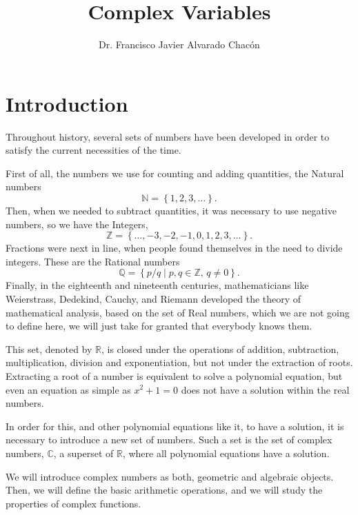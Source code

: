 \documentclass{article}
\newcommand{\reals}{\mathbb{R}}
\newcommand{\complex}{\mathbb{C}}
\begin{document}
\title{Complex Variables}
\author{Dr. Francisco Javier Alvarado Chacón}
\maketitle
\section{Introduction}

Throughout history, several sets of numbers have been developed in order to satisfy the current necessities of the time.

First of all, the numbers we use for counting and adding quantities, the Natural numbers
\[
\mathbb{N}=\left\lbrace 1,2,3,\dots\right\rbrace.
\]
Then, when we needed to subtract quantities, it was necessary to use negative numbers, so we have the Integers,
\[
\mathbb{Z}=\left\lbrace\dots,-3,-2,-1,0,1,2,3,\dots\right\rbrace.
\]
Fractions were next in line, when people found themselves in the need to divide integers. These are the Rational numbers
\[
\mathbb{Q}=\left\lbrace p/q \mid p,q\in\mathbb{Z},\,q\ne 0\right\rbrace.
\]
Finally, in the eighteenth and nineteenth centuries, mathematicians like Weierstrass, Dedekind, Cauchy, and Riemann developed the theory of mathematical analysis, based on the set of Real numbers, which we are not going to define here, we will just take for granted that everybody knows them.

This set, denoted by $\reals$, is closed under the operations of addition, subtraction, multiplication, division and exponentiation, but not under the extraction of roots. Extracting a root of a number is equivalent to solve a polynomial equation, but even an equation as simple as $x^2+1=0$ does not have a solution within the real numbers.

In order for this, and other polynomial equations like it, to have a solution, it is necessary to introduce a new set of numbers. Such a set is the set of complex numbers, $\complex$, a superset of $\reals$, where all polynomial equations have a solution. 

We will introduce complex numbers as both, geometric and algebraic objects. Then, we will define the basic arithmetic operations, and we will study the properties of complex functions.
\end{document}
